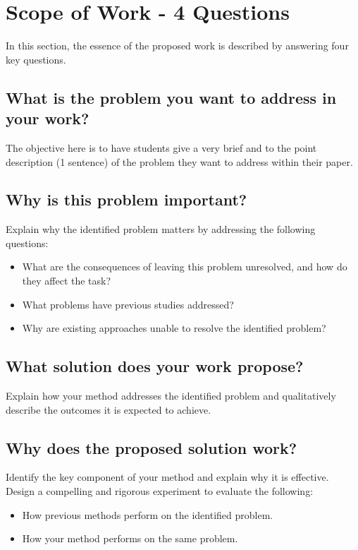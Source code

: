 \section{Scope of Work - 4 Questions}
\noindent
In this section, the essence of the proposed work is described by answering four key
questions.


\subsection{What is the problem you want to address in your work?}
\noindent
The objective here is to have students give a very brief and to the point description (1 sentence) of the problem they want to address within their paper.




\subsection{Why is this problem important?}
\noindent
Explain why the identified problem matters by addressing the following questions:
\begin{itemize}
    \item What are the consequences of leaving this problem unresolved, and how do they affect the task?
    \item What problems have previous studies addressed?
    \item Why are existing approaches unable to resolve the identified problem?
\end{itemize}




\subsection{What solution does your work propose?}
\noindent
Explain how your method addresses the identified problem and qualitatively describe the outcomes it is expected to achieve.




\subsection{Why does the proposed solution work?}
\noindent
Identify the key component of your method and explain why it is effective. Design a compelling and rigorous experiment to evaluate the following:
\begin{itemize}
    \item How previous methods perform on the identified problem.
    \item How your method performs on the same problem.
\end{itemize}
